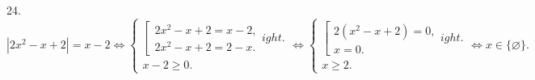 24. $|2x^2-x+2|=x-2\Leftrightarrow \begin{cases} \left[\begin{array}{l}2x^2-x+2=x-2,\\ 2x^2-x+2=2-x.\end{array}
ight.\\ x-2\geqslant0.\end{cases}
\Leftrightarrow \begin{cases} \left[\begin{array}{l}2(x^2-x+2)=0,\\ x=0.\end{array}
ight.\\ x\geqslant2.\end{cases}\Leftrightarrow x\in\{\varnothing\}.$\\
